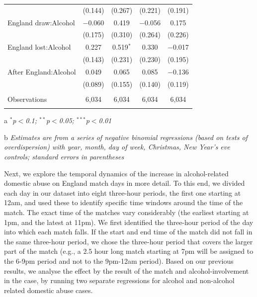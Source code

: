 \documentclass[12pt, letterpaper]{article}
\begin{document}
\begin{table}[!htbp]
{\begin{threeparttable}
\begin{tabular}{@{\extracolsep{5pt}}lcccc}
  & (0.144) & (0.267) & (0.221) & (0.191) \\ 
  England draw:Alcohol & $-$0.060 & 0.419 & $-$0.056 & 0.175 \\ 
  & (0.175) & (0.310) & (0.264) & (0.226) \\ 
  England lost:Alcohol & 0.227 & 0.519$^{*}$ & 0.330 & $-$0.017 \\ 
  & (0.143) & (0.231) & (0.230) & (0.195) \\ 
  After England:Alcohol & 0.049 & 0.065 & 0.085 & $-$0.136 \\ 
  & (0.089) & (0.155) & (0.140) & (0.119) \\ 
 \hline \\[-1.8ex] 
Observations & 6,034 & 6,034 & 6,034 & 6,034 \\ 
\hline 
\hline \\[-1.8ex] 
\end{tabular} 
\begin{tablenotes}
      \item[a] \textit{$^{*}$p$<$0.1; $^{**}$p$<$0.05; $^{***}$p$<$0.01}
      \item[b] \textit{Estimates are from a series of negative binomial regressions (based on tests of overdispersion)  with year, month, day of week, Christmas, New Year's eve controls; standard errors in parentheses}
    \end{tablenotes}
\end{threeparttable} }
\end{table}
Next, we explore the temporal dynamics of the increase in alcohol-related domestic abuse on England match days in more detail. To this end, we divided each day in our dataset into eight three-hour periods, the first one starting at 12am, and used these to identify specific time windows around the time of the match. The exact time of the matches vary considerably (the earliest starting at 1pm, and the latest at 11pm). We first identified the three-hour period of the day into which each match falls. If the start and end time of the match did not fall in the same three-hour period, we chose the three-hour period that covers the larger part of the match (e.g., a 2.5 hour long match starting at 7pm will be assigned to the 6-9pm period and not to the 9pm-12am period). Based on our previous results, we analyse the effect by the result of the match and alcohol-involvement in the case, by running two separate regressions for alcohol and non-alcohol related domestic abuse cases.
\end{document}
